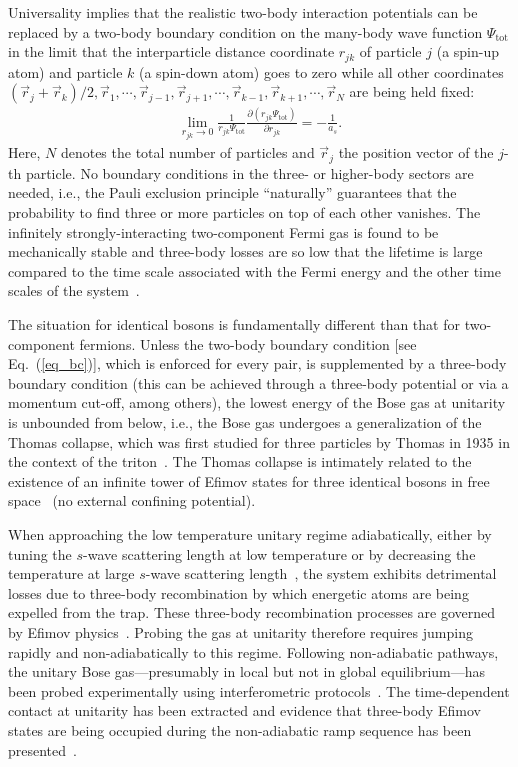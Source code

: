 \documentclass[aps,pra,twocolumn,showpacs,superscriptaddress]{revtex4}
\begin{document}
Universality implies that the realistic two-body interaction
potentials can be replaced by a two-body boundary condition on the
many-body wave function $\Psi_{\text{tot}}$ in the limit that
the interparticle distance
coordinate $r_{jk}$ of particle $j$ 
(a spin-up atom) and particle $k$ (a spin-down atom)
goes to zero
while all other coordinates
$(\vec{r}_j+\vec{r}_k)/2,\vec{r}_1,\cdots,\vec{r}_{j-1},\vec{r}_{j+1},
\cdots,\vec{r}_{k-1},\vec{r}_{k+1},\cdots,\vec{r}_N$
are being held fixed:
\begin{eqnarray}
\label{eq_bc}
\lim_{r_{jk} \rightarrow 0}
\frac{1}{r_{jk} \Psi_{\text{tot}}}
\frac{\partial (r_{jk} \Psi_{\text{tot}})}{\partial r_{jk}}
= -\frac{1}{a_s}.
\end{eqnarray} 
Here, $N$ denotes the total number of particles and 
$\vec{r}_j$ the position vector of the $j$-th particle.
No boundary conditions in the three- or higher-body
sectors are needed, i.e., the Pauli exclusion principle ``naturally''
guarantees that the probability to find three or more
particles on top of each other vanishes.
The infinitely strongly-interacting 
two-component Fermi gas is found to be mechanically stable and three-body 
losses are so low that the lifetime is large compared
to the time scale associated with the Fermi energy and 
the other time scales of the system~\cite{regal2004,zwierlein2004}.

The situation for identical bosons is fundamentally different
than that for two-component fermions.
Unless the two-body boundary condition [see Eq.~(\ref{eq_bc})],
which is enforced for every pair, is supplemented
by a three-body boundary condition
(this can be achieved through a three-body potential or
via a momentum cut-off, among others), 
the lowest energy of the Bose gas at unitarity is 
unbounded from below, i.e., the Bose gas undergoes a generalization
of the Thomas collapse, which was first
studied for three particles by Thomas in 1935 in the context of the
triton~\cite{thomas1935}.
The Thomas collapse is intimately related to the
existence of an infinite tower of
Efimov states for three identical bosons in free
space~\cite{efimov70,braaten2006,naidon2017}
(no external confining potential).

When approaching the low temperature unitary regime adiabatically,
either by tuning the $s$-wave scattering length at low temperature
or by decreasing the temperature at large $s$-wave scattering 
length~\cite{navon2011,wild2012,rem2013,fletcher2013,makotyn2014,eismann2016,klauss2017,fletcher2017},
the system exhibits detrimental losses
due to three-body recombination by which
energetic atoms are being expelled from the trap.
These three-body recombination processes are governed by
Efimov physics~\cite{esry1999,nielsen1999,bedaque2000,grimm2006}.
Probing the gas at unitarity therefore requires jumping rapidly
and non-adiabatically to this regime.
Following non-adiabatic pathways,
the unitary Bose gas---presumably in local but not
in global equilibrium---has been probed experimentally
using interferometric
protocols~\cite{fletcher2013,klauss2017}.
The time-dependent contact at unitarity has been extracted and evidence
that three-body Efimov states
are being occupied during the non-adiabatic
ramp sequence has been presented~\cite{wild2012,klauss2017,fletcher2017}.
\end{document}
